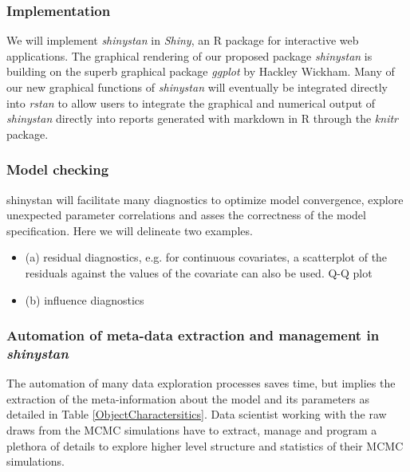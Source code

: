 \documentclass[11pt,notitlepage]{article}
\begin{document}
\subsubsection*{Implementation}
We will implement \textit{shinystan} in \textit{Shiny}, an R package for interactive 
web applications. The graphical rendering of our proposed package \textit{shinystan} 
is building on the superb graphical package \textit{ggplot} by Hackley Wickham. 
Many of our new graphical functions of \textit{shinystan} will eventually be 
integrated directly into \textit{rstan} to allow users to integrate the graphical 
and numerical output of \textit{shinystan} directly into reports generated with 
markdown in R through the \textit{knitr} package.

\subsubsection*{Model checking}
shinystan will facilitate many diagnostics to optimize model convergence, explore unexpected parameter correlations and asses the correctness of the model specification. Here we will delineate two examples.
\begin{itemize}
\item (a) residual diagnostics, e.g. for continuous covariates, a scatterplot of the residuals against the values of the covariate can also be used. Q-Q plot
 
\item (b) influence diagnostics
\end{itemize}

\subsubsection*{Automation of meta-data extraction and management in \textit{shinystan}}
The automation of many data exploration processes saves time, but implies the extraction of the meta-information about the model and its parameters as detailed in Table \ref{ObjectCharactersitics}. Data scientist working with the raw draws from the MCMC simulations have to extract, manage and program a plethora of details to explore higher level structure and statistics of their MCMC simulations. 
\end{document}
